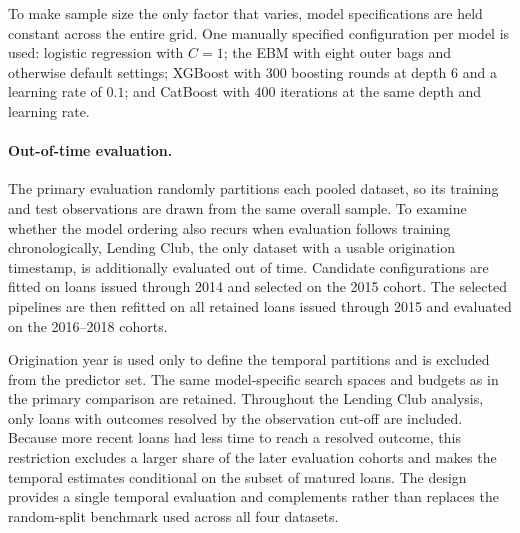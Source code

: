 To make sample size the only factor that varies, model specifications are held constant
across the entire grid. One manually specified configuration per model is used: logistic
regression with $C=1$; the EBM with eight outer bags and otherwise default settings;
XGBoost with 300 boosting rounds at depth 6 and a learning rate of $0.1$; and CatBoost
with 400 iterations at the same depth and learning rate.

\paragraph{Out-of-time evaluation.}
The primary evaluation randomly partitions each pooled dataset, so its training and test
observations are drawn from the same overall sample. To examine whether the model
ordering also recurs when evaluation follows training chronologically, Lending Club, the
only dataset with a usable origination timestamp, is additionally evaluated out of time.
Candidate configurations are fitted on loans issued through 2014 and selected on the
2015 cohort. The selected pipelines are then refitted on all retained loans issued
through 2015 and evaluated on the 2016--2018 cohorts.


Origination year is used only to define the temporal partitions and is excluded from the
predictor set. The same model-specific search spaces and budgets as in the primary
comparison are retained. Throughout the Lending Club analysis, only loans with outcomes
resolved by the observation cut-off are included. Because more recent loans had less
time to reach a resolved outcome, this restriction excludes a larger share of the later
evaluation cohorts and makes the temporal estimates conditional on the subset of
matured loans. The design provides a single temporal evaluation and complements rather than replaces the random-split
benchmark used across all four datasets.

